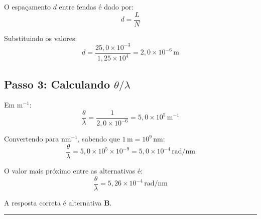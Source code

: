 \documentclass[a4paper,12pt]{article}
\begin{document}
\begin{flushleft}
O espaçamento \(d\) entre fendas é dado por:
\[
d = \frac{L}{N}
\]

Substituindo os valores:
\[
d = \frac{25{,}0 \times 10^{-3}}{1{,}25 \times 10^4} = 2{,}0 \times 10^{-6}\,\mathrm{m}
\]

\subsection*{Passo 3: Calculando \( \theta/\lambda \)}

Em \(\mathrm{m}^{-1}\):
\[
\frac{\theta}{\lambda} = \frac{1}{2{,}0 \times 10^{-6}} = 5{,}0 \times 10^{5}\,\mathrm{m}^{-1}
\]

Convertendo para \(\mathrm{nm}^{-1}\), sabendo que \(1\,\mathrm{m} = 10^{9}\,\mathrm{nm}\):
\[
\frac{\theta}{\lambda} = 5{,}0 \times 10^{5} \times 10^{-9} = 5{,}0 \times 10^{-4}\,\mathrm{rad/nm}
\]

O valor mais próximo entre as alternativas é:
\[
\boxed{\frac{\theta}{\lambda} = 5{,}26 \times 10^{-4}\,\mathrm{rad/nm}}
\]


A resposta correta é alternativa \colorbox{green!50}{\textbf{B}}.
\end{flushleft}

\noindent\rule{\linewidth}{0.6pt}\\
\end{document}
